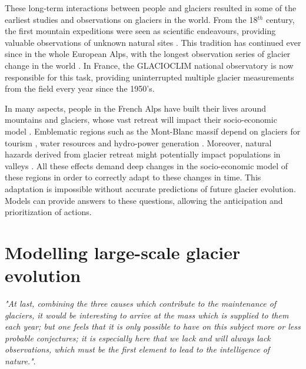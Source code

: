 These long-term interactions between people and glaciers resulted in some of the earliest studies and observations on glaciers in the world. From the 18$^{th}$ century, the first mountain expeditions were seen as scientific endeavours, providing valuable observations of unknown natural sites \citep{richalet_scientific_2001}. This tradition has continued ever since in the whole European Alps, with the longest observation series of glacier change in the world \citep{glamos_swiss_2019}. In France, the GLACIOCLIM national observatory is now responsible for this task, providing uninterrupted multiple glacier measurements from the field every year since the 1950's.

In many aspects, people in the French Alps have built their lives around mountains and glaciers, whose vast retreat will impact their socio-economic model \citep{mourey_evolution_2017, spandre_winter_2019}. Emblematic regions such as the Mont-Blanc massif depend on glaciers for tourism \citep{schut_sport_2013, spandre_climate_2019}, water resources and hydro-power generation \citep{laurent_impact_2020}. Moreover, natural hazards derived from glacier retreat might potentially impact populations in valleys \citep{magnin_estimating_2020}. All these effects demand deep changes in the socio-economic model of these regions in order to correctly adapt to these changes in time. This adaptation is impossible without accurate predictions of future glacier evolution. Models can provide answers to these questions, allowing the anticipation and prioritization of actions.

\section{Modelling large-scale glacier evolution}

\emph{"At last, combining the three causes which contribute to the maintenance of glaciers, it would be interesting to arrive at the mass which is supplied to them each year; but one feels that it is only possible to have on this subject more or less probable conjectures; it is especially here that we lack and will always lack observations, which must be the first element to lead to the intelligence of nature."}.

